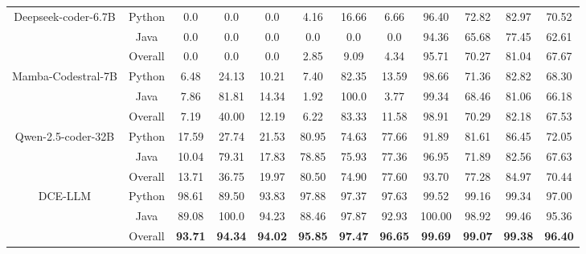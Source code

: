 \documentclass[11pt]{article}
\begin{document}
\begin{table}[h!]
\begin{tabular}{c  c ccc ccc ccc c}
\midrule

\multirow{3}{*}{Deepseek-coder-6.7B} &Python   & 0.0 & 0.0 & 0.0 & 4.16 & 16.66 & 6.66 & 96.40 & 72.82 & 82.97 & 70.52\\
 & Java   & 0.0 & 0.0 & 0.0 & 0.0 & 0.0 & 0.0 & 94.36 & 65.68 & 77.45 & 62.61\\
 & \cellcolor{gray!20}Overall & \cellcolor{gray!20}0.0 & \cellcolor{gray!20}0.0 & \cellcolor{gray!20}0.0 & \cellcolor{gray!20}2.85 & \cellcolor{gray!20}9.09 & \cellcolor{gray!20}4.34 &\cellcolor{gray!20}95.71 & \cellcolor{gray!20}70.27 & \cellcolor{gray!20}81.04  & \cellcolor{gray!20}67.67 \\

\midrule

\multirow{3}{*}{Mamba-Codestral-7B} &Python   & 6.48 & 24.13 & 10.21 & 7.40 & 82.35 & 13.59 & 98.66 & 71.36 & 82.82 & 68.30 \\
 & Java   & 7.86 & 81.81 & 14.34 & 1.92 & 100.0 & 3.77 & 99.34 & 68.46 & 81.06 & 66.18\\
 & \cellcolor{gray!20}Overall & \cellcolor{gray!20}7.19 & \cellcolor{gray!20}40.00 & \cellcolor{gray!20}12.19 & \cellcolor{gray!20}6.22 & \cellcolor{gray!20}83.33 & \cellcolor{gray!20}11.58 &\cellcolor{gray!20}98.91 & \cellcolor{gray!20}70.29 & \cellcolor{gray!20}82.18  & \cellcolor{gray!20}67.53 \\

\midrule

\multirow{3}{*}{Qwen-2.5-coder-32B} & Python  & 17.59 & 27.74 & 21.53 & 80.95 & 74.63 & 77.66 & 91.89 & 81.61 & 86.45 & 72.05\\
 & Java  & 10.04 & 79.31 & 17.83 & 78.85 & 75.93 & 77.36 & 96.95 & 71.89 & 82.56 & 67.63\\
 & \cellcolor{gray!20}Overall  & \cellcolor{gray!20}13.71 & \cellcolor{gray!20}36.75 & \cellcolor{gray!20}19.97 & \cellcolor{gray!20}80.50 & \cellcolor{gray!20}74.90 & \cellcolor{gray!20}77.60 & \cellcolor{gray!20}93.70 & \cellcolor{gray!20}77.28 & \cellcolor{gray!20}84.97 & \cellcolor{gray!20}70.44\\
\midrule
\midrule

\multirow{3}{*}{DCE-LLM} & Python & 98.61 & 89.50 & 93.83 & 97.88 & 97.37 & 97.63 & 99.52 & 99.16 & 99.34 & 97.00 \\
 & Java & 89.08 & 100.0 & 94.23 & 88.46 & 97.87 & 92.93 & 100.00 & 98.92 & 99.46 & 95.36 \\
 & \cellcolor{gray!20}Overall & \cellcolor{gray!20}\textbf{93.71} & \cellcolor{gray!20} \textbf{94.34} & \cellcolor{gray!20}\textbf{94.02} & \cellcolor{gray!20}\textbf{95.85} & \cellcolor{gray!20}\textbf{97.47} & \cellcolor{gray!20}\textbf{96.65} & \cellcolor{gray!20}\textbf{99.69} & \cellcolor{gray!20}\textbf{99.07} & \cellcolor{gray!20}\textbf{99.38} & \cellcolor{gray!20}\textbf{96.40} \\


\bottomrule
\end{tabular}
\label{taba3}
\end{table}
\end{document}
